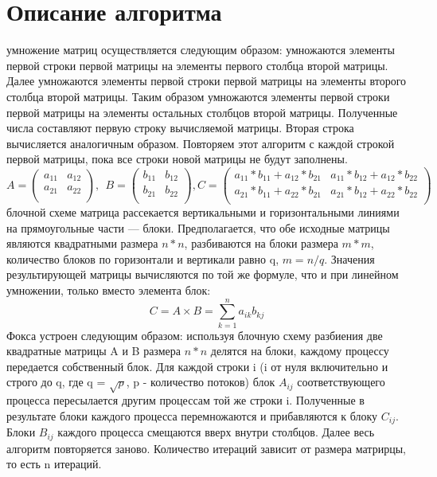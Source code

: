 \documentclass{report}
\begin{document}
\section*{Описание алгоритма}
 умножение матриц осуществляется следующим образом: умножаются элементы первой строки первой матрицы на элементы первого столбца второй матрицы. Далее умножаются элементы первой строки первой матрицы на элементы второго столбца второй матрицы. Таким образом умножаются элементы первой строки первой матрицы на элементы остальных столбцов второй матрицы. Полученные числа составляют первую строку вычисляемой матрицы. Вторая строка вычисляется аналогичным образом. Повторяем этот алгоритм с каждой строкой первой матрицы, пока все строки новой матрицы не будут заполнены.
\begin{equation}A= \left( \begin{matrix}
a_{11}  &  a_{12}\\
a_{21}  &  a_{22}\\
\end{matrix}
 \right) ,~~B= \left( \begin{matrix}
b_{11}  &   b_{12}\\
b_{21}  &   b_{22}\\
\end{matrix}
 \right) , C= \left( \begin{matrix}
a_{11} * b_{11} + a_{12} * b_{21}  &  a_{11} * b_{12} + a_{12} * b_{22} \\
a_{21} * b_{11} + a_{22} * b_{21}  &  a_{21} * b_{12} + a_{22} * b_{22} \\
\end{matrix}
 \right) \end{equation}
 блочной схеме матрица рассекается вертикальными и горизонтальными линиями на прямоугольные части — блоки. Предполагается, что обе исходные матрицы являются квадратными размера $n*n$, разбиваются на блоки размера $m*m$, количество блоков по горизонтали и вертикали равно q, $m=n/q$. Значения результирующей матрицы вычисляются по той же формуле, что и при линейном умножении, только вместо элемента блок:\\
\begin{equation}
  C=A \times B= \sum _{k=1}^{n}a_{ik}b_{kj} 
\end{equation}
 Фокса устроен следующим образом: используя блочную схему разбиения две квадратные матрицы A и B размера $n*n$ делятся на блоки, каждому процессу передается собственный блок. Для каждой строки i (i от нуля включительно и строго до q, где q = $\sqrt{p}$, p - количество потоков) блок $A_{ij}$ соответствующего процесса пересылается другим процессам той же строки i. Полученные в результате блоки каждого процесса перемножаются и прибавляются к блоку $C_{ij}$. Блоки $B_{ij}$ каждого процесса смещаются вверх внутри столбцов. Далее весь алгоритм повторяется заново. Количество итераций зависит от размера матрирцы, то есть n итераций. 
\end{document}
